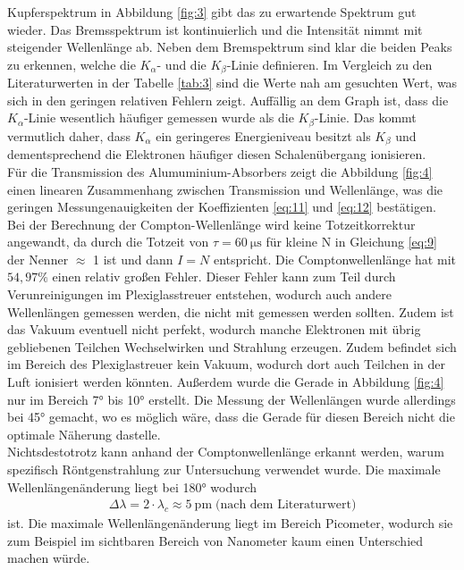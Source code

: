 \justifying Kupferspektrum in Abbildung \ref{fig:3} gibt das zu erwartende Spektrum gut
wieder. Das Bremsspektrum ist kontinuierlich und die Intensität nimmt mit steigender Wellenlänge ab.
Neben dem Bremspektrum sind klar die beiden Peaks zu erkennen, welche die $K_{\alpha} $-
und die $K_{\beta} $-Linie definieren. Im Vergleich zu den Literaturwerten in der Tabelle \ref{tab:3}
sind die Werte nah am gesuchten Wert, was sich in den geringen relativen Fehlern zeigt.
Auffällig an dem Graph ist, dass die $K_{\alpha} $-Linie wesentlich häufiger gemessen wurde
als die $K_{\beta}$-Linie. Das kommt vermutlich daher, dass $K_{\alpha} $ ein
geringeres Energieniveau besitzt als $K_{\beta} $ und dementsprechend die 
Elektronen häufiger diesen Schalenübergang ionisieren.\\
Für die Transmission des Alumuminium-Absorbers zeigt die Abbildung
\ref{fig:4} einen linearen Zusammenhang zwischen Transmission und Wellenlänge,
was die geringen Messungenauigkeiten der Koeffizienten \eqref{eq:11} und \eqref{eq:12}
bestätigen.
Bei der Berechnung der Compton-Wellenlänge wird keine Totzeitkorrektur angewandt,
da durch die Totzeit von $\tau = \SI{60}{\micro\second} $ für kleine N in 
Gleichung \eqref{eq:9} der Nenner $\approx$ 1 ist und dann $I=N$ entspricht.
Die Comptonwellenlänge hat mit $54,97\%$ einen relativ großen Fehler. Dieser Fehler
kann zum Teil  durch Verunreinigungen im Plexiglasstreuer entstehen, wodurch auch andere 
Wellenlängen gemessen werden, die nicht mit gemessen werden sollten.
Zudem ist das Vakuum eventuell nicht perfekt, wodurch manche Elektronen mit
übrig gebliebenen Teilchen Wechselwirken und Strahlung erzeugen. Zudem befindet sich im 
Bereich des Plexiglastreuer kein Vakuum, wodurch dort auch Teilchen in der Luft
ionisiert werden könnten. Außerdem wurde die Gerade in Abbildung \ref{fig:4} nur im
Bereich 7° bis 10° erstellt. Die Messung der Wellenlängen wurde allerdings
bei 45° gemacht, wo es möglich wäre, dass die Gerade für diesen Bereich nicht
die optimale Näherung dastelle. \\
Nichtsdestotrotz kann anhand der Comptonwellenlänge erkannt werden, warum spezifisch 
Röntgenstrahlung zur Untersuchung verwendet wurde. Die maximale Wellenlängenänderung
liegt bei 180° wodurch 
\begin{align}
    \Delta \lambda = 2 \cdot \lambda _c \approx \SI{5}{\pico\meter} \;\text{(nach dem Literaturwert)}
\end{align}
ist. Die maximale Wellenlängenänderung liegt im Bereich Picometer, wodurch sie zum Beispiel im sichtbaren Bereich von Nanometer
kaum einen Unterschied machen würde.




\newpage
\printbibliography

